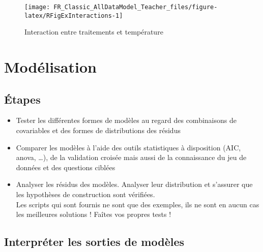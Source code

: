 \documentclass[french,a4paper]{article}
\providecommand{\tightlist}{%
  \setlength{\itemsep}{0pt}\setlength{\parskip}{0pt}}
\begin{document}
\begin{figure}[!h]

{\centering \texttt{[image: FR\_Classic\_AllDataModel\_Teacher\_files/figure-latex/RFigExInteractions-1]} 

}

\caption{Interaction entre traitements et température}\label{fig:RFigExInteractions}
\end{figure}

\hypertarget{modelisation}{%
\section{Modélisation}\label{modelisation}}

\hypertarget{etapes-1}{%
\subsection{Étapes}\label{etapes-1}}


\begin{itemize}
\tightlist
\item
  Tester les différentes formes de modèles au regard des combinaisons de covariables et des formes de distributions des résidus
\item
  Comparer les modèles à l'aide des outils statistiques à disposition (AIC, anova, \ldots), de la validation croisée mais aussi de la connaissance du jeu de données et des questions ciblées
\item
  Analyser les résidus des modèles. Analyser leur distribution et s'assurer que les hypothèses de construction sont vérifiées.\\
  \nopandoc{\begin{redbox}}
  Les scripts qui sont fournis ne sont que des exemples, ils ne sont en aucun cas les meilleures solutions !
  Faîtes vos propres tests !
  \nopandoc{\end{redbox}}
\end{itemize}

\hypertarget{interpreter-les-sorties-de-modeles}{%
\subsection{Interpréter les sorties de modèles}\label{interpreter-les-sorties-de-modeles}}
\end{document}
